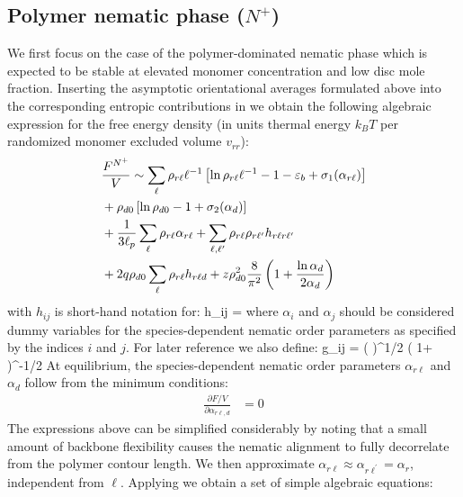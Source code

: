 \subsection{Polymer nematic phase ($N^{+}$)}

We first focus on the case of the polymer-dominated nematic phase which is expected to be stable at elevated monomer concentration and low disc mole fraction.  Inserting the asymptotic orientational averages formulated above into the corresponding entropic contributions in  we obtain the following algebraic expression for the free energy density (in units thermal energy $k_{B}T$ per randomized monomer excluded volume $v_{rr}$):
\begin{align}
   & \frac{F^{N^{+}}}{V}  \sim  \sum_{\ell }  \rho_{r \ell} \ell^{-1}  \left [ \ln \rho_{r \ell} \ell^{-1}  -1 - \varepsilon_{b}  + \sigma_{1}(\alpha_{r \ell}) \right ] \nonumber \\
   & + \rho_{d0} \left [ \ln \rho_{d0} -1 + \sigma_{2}(\alpha_{d}) \right ]  \nonumber \\ 
    & + \frac{1}{3\ell_{p}} \sum_{\ell } \rho_{r \ell} \alpha_{r \ell} + \sum_{\ell,\ell^{\prime}} \rho_{r \ell} \rho_{r \ell^{\prime}} h_{r\ell r\ell^{\prime}} \nonumber \\
    & + 2 q \rho_{d0} \sum_{\ell} \rho_{r \ell} h_{r\ell d} + z \rho_{d0}^{2} \frac{8}{\pi^{2}} \left ( 1+ \frac{\ln \alpha_{d}}{2 \alpha_{d}}   \right ) 
\end{align}
with $h_{ij}$ is short-hand notation for:
\beq
h_{ij} =  
\eeq
where $\alpha_{i}$ and $\alpha_{j}$ should be considered dummy variables for the species-dependent nematic order parameters as specified by the indices $i$ and $j$. 
For later reference we also define:
\beq
g_{ij} = \left (   \right)^{1/2}  \left ( 1+  \right )^{-1/2}
\eeq
At equilibrium, the species-dependent nematic order parameters $\alpha_{r\ell}$ and $\alpha_{d}$ follow from the minimum conditions:
\begin{align}
    \frac{\partial F/V}{\partial \alpha_{r \ell,d}} &=0 
    \label{dalpha}
\end{align}
The expressions above can be simplified considerably by noting that a small amount  of backbone flexibility causes the nematic alignment to fully decorrelate from the polymer contour length. We then approximate $\alpha_{r \ell} \approx \alpha_{r \ell^{\prime}} = \alpha_{r}$, independent from $\ell$.   Applying  we obtain a set of simple algebraic equations:

